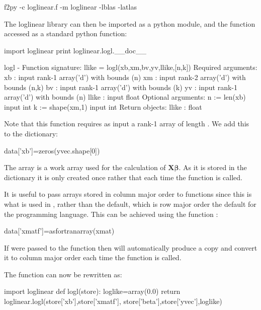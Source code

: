 \documentclass[article]{jss}
\begin{document}
\begin{Code}
f2py -c loglinear.f -m loglinear -lblas -latlas
\end{Code}

The loglinear library can then be imported as a python module, and the function  accessed as a standard python function:

\begin{CodeChunk}
\begin{CodeInput}
import loglinear
print loglinear.logl.__doc__
\end{CodeInput}
\begin{CodeOutput}
logl - Function signature:
  llike = logl(xb,xm,bv,yv,llike,[n,k])
Required arguments:
  xb : input rank-1 array('d') with bounds (n)
  xm : input rank-2 array('d') with bounds (n,k)
  bv : input rank-1 array('d') with bounds (k)
  yv : input rank-1 array('d') with bounds (n)
  llike : input float
Optional arguments:
  n := len(xb) input int
  k := shape(xm,1) input int
Return objects:
  llike : float
\end{CodeOutput}
\end{CodeChunk}

Note that this function requires as input  a rank-1 array of length
. We add this to the  dictionary:
\begin{Code}
data['xb']=zeros(yvec.shape[0])
\end{Code}
The array  is a work array used for the
calculation of $\bm{X}\bm{\beta}.$ As it is stored in the
 dictionary  it is only created once
rather that each time the function  is called.

It is useful to pass arrays stored in column major order to 
functions since this is what is used in , rather
than the  default, which is row major order the
default for the  programming language. This can be
achieved using the  function :
\begin{Code}
data['xmatf']=asfortranarray(xmat)
\end{Code}
If  were passed to the function
 then  will automatically produce a
copy and convert it to column major order each time the function
 is called.

The function  can now be rewritten as:

\begin{Code}
import loglinear
def logl(store):
	loglike=array(0.0)     
	return loglinear.logl(store['xb'],store['xmatf'], 
                  store['beta'],store['yvec'],loglike)
\end{Code}
\end{document}
